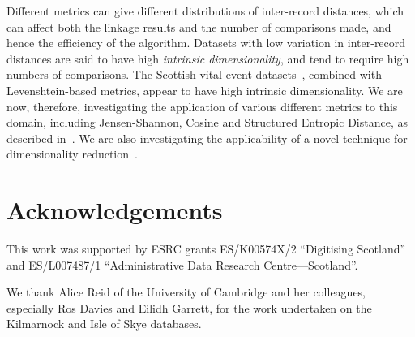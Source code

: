 \documentclass{llncs}
\begin{document}
Different metrics can give different distributions of inter-record
distances, which can affect both the linkage results and the number of
comparisons made, and hence the efficiency of the algorithm. Datasets
with low variation in inter-record distances are said to have high
\textit{intrinsic dimensionality}, and tend to require high numbers of
comparisons. The Scottish vital event datasets~\cite{reid2002}, combined
with Levenshtein-based metrics, appear to have high intrinsic
dimensionality. We are now, therefore, investigating the application of
various different metrics to this domain, including Jensen-Shannon,
Cosine and Structured Entropic Distance, as described
in~\cite{Connor2016}. We are also investigating the applicability of a
novel technique for dimensionality reduction~\cite{Connor2017}.


\section{Acknowledgements}

This work was supported by ESRC grants ES/K00574X/2 ``Digitising Scotland''
and ES/L007487/1 ``Administrative Data Research Centre---Scotland''.

We thank Alice Reid of the University of Cambridge and her colleagues,
especially Ros Davies and Eilidh Garrett, for the work undertaken on the
Kilmarnock and Isle of Skye databases.



 

\end{document}
